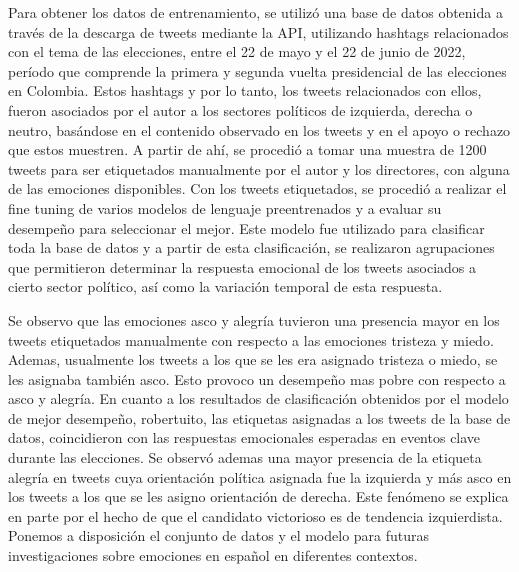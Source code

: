 Para obtener los datos de entrenamiento, se utilizó una base de datos obtenida a través de la descarga de tweets mediante la API, utilizando hashtags relacionados con el tema de las elecciones, entre el 22 de mayo y el 22 de junio de 2022, período que comprende la primera y segunda vuelta presidencial de las elecciones en Colombia. Estos hashtags y por lo tanto, los tweets relacionados con ellos, fueron asociados por el autor a los sectores políticos de izquierda, derecha o neutro, basándose en el contenido observado en los tweets y en el apoyo o rechazo que estos muestren. A partir de ahí, se procedió a tomar una muestra de 1200 tweets para ser etiquetados manualmente por el autor y los directores, con alguna de las emociones disponibles. Con los tweets etiquetados, se procedió a realizar el fine tuning de varios modelos de lenguaje preentrenados y a evaluar su desempeño para seleccionar el mejor. Este modelo fue utilizado para clasificar toda la base de datos y a partir de esta clasificación, se realizaron agrupaciones que permitieron determinar la respuesta emocional de los tweets asociados a cierto sector político, así como la variación temporal de esta respuesta.


Se observo que las emociones asco y alegría tuvieron una presencia mayor en los tweets etiquetados manualmente con respecto a las emociones tristeza y miedo. Ademas, usualmente los tweets a los que se les era asignado tristeza o miedo, se les asignaba también asco. Esto provoco  un desempeño mas pobre con respecto a asco y alegría. En cuanto a los resultados de clasificación obtenidos por el modelo de mejor desempeño, robertuito, las etiquetas asignadas a los tweets de la base de datos,  coincidieron con las respuestas emocionales esperadas en eventos clave durante las elecciones. Se observó ademas una mayor presencia de la etiqueta alegría en tweets cuya orientación política asignada fue la  izquierda y más asco en los tweets a los que se les asigno orientación de  derecha. Este fenómeno se explica en parte por el hecho de que el candidato victorioso es de tendencia izquierdista. Ponemos a disposición el conjunto de datos y el modelo para futuras investigaciones sobre emociones en español en diferentes contextos.


